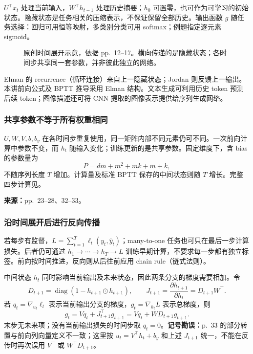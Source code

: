 $U^\top x_t$ 处理当前输入，$W^\top h_{t-1}$ 处理历史摘要；$h_0$ 可置零，也可作为可学习的初始状态。隐藏状态是任务相关的压缩表示，不保证保留全部历史。输出函数 $g$ 随任务选择：回归可用恒等映射，多类别分类可用 softmax；例题指定逐元素 sigmoid。

\begin{figure}[htbp]
 \centering
 
 \caption{原创时间展开示意，依据 pp.~12--17。横向传递的是隐藏状态；各时间步共享同一套参数，并非彼此独立的网络。}
 \label{fig:sc4001-l08-unfolding}
\end{figure}

Elman 的 recurrence（循环连接）来自上一隐藏状态；Jordan 则反馈上一输出。本讲前向公式及 BPTT 推导采用 Elman 结构。文本生成可利用历史 token 预测后续 token；图像描述还可将 CNN 提取的图像表示提供给序列生成网络。

\subsubsection{共享参数不等于所有权重相同}

$U,W,V,b,b_y$ 在各时间步重复使用，同一矩阵内部不同元素仍可不同。一次前向计算中参数不变，而 $h_t$ 随输入变化；训练更新的是共享参数。固定维度下，含 bias 的参数量为
\[
 P=dm+m^2+mk+m+k,
\]
不随序列长度 $T$ 增加。计算量及标准 BPTT 保存的中间状态则随 $T$ 增长。完整四步计算见。


\textbf{来源：}pp.~23--28、32--33。

\subsubsection{沿时间展开后进行反向传播}

若每步有监督，$L=\sum_{t=1}^T\ell_t(y_t,\hat y_t)$；many-to-one 任务也可只在最后一步计算损失。后者仍可通过 $h_1\to\cdots\to h_T\to L$ 训练早期计算，不要求每一步都有独立标签。前向按时间推进，反向则从后往前应用 chain rule（链式法则）。

中间状态 $h_t$ 同时影响当前输出及未来状态，因此两条分支的梯度需要相加。令
\[
 D_{t+1}=\operatorname{diag}(1-h_{t+1}\odot h_{t+1}),\qquad
 J_{t+1}=\frac{\partial h_{t+1}}{\partial h_t}=D_{t+1}W^\top.
\]
若 $q_t=\nabla_{u_t}\ell_t$ 表示当前输出分支的梯度，$g_t=\nabla_{h_t}L$ 表示总梯度，则
\[
 \boxed{g_t=Vq_t+J_{t+1}^\top g_{t+1}
              =Vq_t+W D_{t+1}g_{t+1}}.
\]
末步无未来项；没有当前输出损失的时间步取 $q_t=0$。\textbf{记号勘误：}p.~33 的部分转置与前向列向量定义不一致；这里按 $u_t=V^\top h_t+b_y$ 和上述 $J_{t+1}$ 统一，不能在反传时再次误用 $V^\top$ 或 $W^\top D_{t+1}$。

